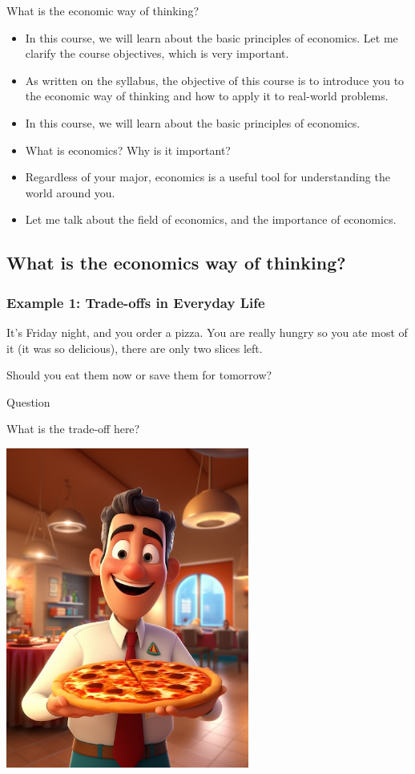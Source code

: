 \documentclass[
  letterpaper,
  DIV=11,
  numbers=noendperiod]{scrartcl}
\providecommand{\tightlist}{%
  \setlength{\itemsep}{0pt}\setlength{\parskip}{0pt}}\usepackage{longtable,booktabs,array}
\begin{document}
What is the economic way of thinking?

\begin{itemize}
\tightlist
\item
  In this course, we will learn about the basic principles of economics.
  Let me clarify the course objectives, which is very important.
\item
  As written on the syllabus, the objective of this course is to
  introduce you to the economic way of thinking and how to apply it to
  real-world problems.
\end{itemize}

\begin{itemize}
\tightlist
\item
  In this course, we will learn about the basic principles of economics.
\item
  What is economics? Why is it important?
\item
  Regardless of your major, economics is a useful tool for understanding
  the world around you.
\item
  Let me talk about the field of economics, and the importance of
  economics.
\end{itemize}

\subsection{What is the economics way of
thinking?}\label{what-is-the-economics-way-of-thinking}

\subsubsection{Example 1: Trade-offs in Everyday
Life}\label{example-1-trade-offs-in-everyday-life}

It's Friday night, and you order a pizza. You are really hungry so you
ate most of it (it was so delicious), there are only two slices left.

Should you eat them now or save them for tomorrow?

Question

What is the trade-off here?

\includegraphics[width=0.6\textwidth,height=\textheight]{lab1_files/mediabag/view-cartoon-waiter-.jpg}
\end{document}
